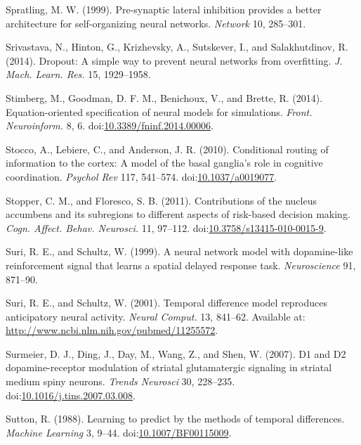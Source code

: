 \documentclass[
  11pt,
  a4paper,
]{scrbook}
\newlength{\cslhangindent}
\newenvironment{CSLReferences}[2] %
 {\begin{list}{}{%
  \setlength{\itemindent}{0pt}
  \setlength{\leftmargin}{0pt}
  \setlength{\parsep}{0pt}
  \ifodd #1
   \setlength{\leftmargin}{\cslhangindent}
   \setlength{\itemindent}{-1\cslhangindent}
  \fi
  \setlength{\itemsep}{#2\baselineskip}}}
 {\end{list}}
\begin{document}
\begin{CSLReferences}{1}{1}
Spratling, M. W. (1999). Pre-synaptic lateral inhibition provides a
better architecture for self-organizing neural networks. \emph{Network}
10, 285--301.

Srivastava, N., Hinton, G., Krizhevsky, A., Sutskever, I., and
Salakhutdinov, R. (2014). Dropout: A simple way to prevent neural
networks from overfitting. \emph{J. Mach. Learn. Res.} 15, 1929--1958.

Stimberg, M., Goodman, D. F. M., Benichoux, V., and Brette, R. (2014).
{Equation-oriented specification of neural models for simulations.}
\emph{Front. Neuroinform.} 8, 6.
doi:\href{https://doi.org/10.3389/fninf.2014.00006}{10.3389/fninf.2014.00006}.

Stocco, A., Lebiere, C., and Anderson, J. R. (2010). Conditional routing
of information to the cortex: A model of the basal ganglia's role in
cognitive coordination. \emph{Psychol Rev} 117, 541--574.
doi:\href{https://doi.org/10.1037/a0019077}{10.1037/a0019077}.

Stopper, C. M., and Floresco, S. B. (2011). {Contributions of the
nucleus accumbens and its subregions to different aspects of risk-based
decision making.} \emph{Cogn. Affect. Behav. Neurosci.} 11, 97--112.
doi:\href{https://doi.org/10.3758/s13415-010-0015-9}{10.3758/s13415-010-0015-9}.

Suri, R. E., and Schultz, W. (1999). A neural network model with
dopamine-like reinforcement signal that learns a spatial delayed
response task. \emph{Neuroscience} 91, 871--90.

Suri, R. E., and Schultz, W. (2001). {Temporal difference model
reproduces anticipatory neural activity.} \emph{Neural Comput.} 13,
841--62. Available at:
\url{http://www.ncbi.nlm.nih.gov/pubmed/11255572}.

Surmeier, D. J., Ding, J., Day, M., Wang, Z., and Shen, W. (2007). D1
and D2 dopamine-receptor modulation of striatal glutamatergic signaling
in striatal medium spiny neurons. \emph{Trends Neurosci} 30, 228--235.
doi:\href{https://doi.org/10.1016/j.tins.2007.03.008}{10.1016/j.tins.2007.03.008}.

Sutton, R. (1988). Learning to predict by the methods of temporal
differences. \emph{Machine Learning} 3, 9--44.
doi:\href{https://doi.org/10.1007/BF00115009}{10.1007/BF00115009}.


\end{CSLReferences}
\end{document}
